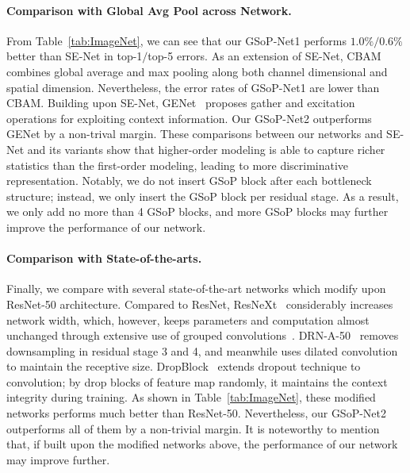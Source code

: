 \documentclass[10pt,twocolumn,letterpaper]{article}
\begin{document}
\vspace{-6pt}\paragraph{Comparison with Global Avg Pool across Network.}   From Table~\ref{tab:ImageNet}, we can see that our GSoP-Net1 performs $1.0\%/0.6\%$ better than SE-Net in  top-1$/$top-5 errors. As an extension of SE-Net, CBAM combines global average and max pooling along both channel dimensional and spatial dimension. Nevertheless, the error rates of GSoP-Net1 are lower than CBAM. Building upon SE-Net, GENet~\cite{hu2018genet} proposes gather and excitation operations for exploiting context information. Our GSoP-Net2 outperforms GENet by a non-trival margin.  These  comparisons between our networks and SE-Net and its variants show that higher-order  modeling is able to capture richer statistics than the first-order modeling, leading to more discriminative representation. Notably,  we do not insert  GSoP block after each bottleneck structure; instead, we only insert the GSoP block per residual stage. As a result, we only add no more than 4 GSoP blocks, and more GSoP blocks may further improve the performance of our network.  

\vspace{-10pt}\paragraph{Comparison with State-of-the-arts.} 
Finally, we compare with several state-of-the-art networks which modify upon ResNet-50 architecture. Compared to ResNet,  ResNeXt~\cite{Xiao_2018_CVPR} considerably increases network width, which, however, keeps parameters and computation almost unchanged through extensive use of grouped convolutions~\cite{Krizhevsky2012ImageNet}. DRN-A-50~\cite{yu2017dilated}  removes downsampling in residual stage 3 and 4, and meanwhile uses dilated convolution to maintain the receptive size.  DropBlock~\cite{ghiasi2018dropblock}  extends dropout technique to  convolution; by drop  blocks of feature map randomly, it  maintains the context integrity during training. As shown in Table~\ref{tab:ImageNet},  these modified networks performs much better than ResNet-50. Nevertheless, our GSoP-Net2 outperforms all of them by a non-trivial  margin. It is noteworthy to mention that, if built upon the modified networks above,  the performance of our network may improve further.
\end{document}
